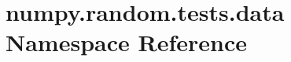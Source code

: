 \hypertarget{namespacenumpy_1_1random_1_1tests_1_1data}{}\section{numpy.\+random.\+tests.\+data Namespace Reference}
\label{namespacenumpy_1_1random_1_1tests_1_1data}
